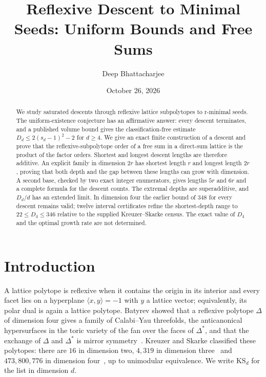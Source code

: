 \documentclass[manuscript]{aomart}
\date{October 26, 2026}
\title[Reflexive descent and free sums]{Reflexive Descent to Minimal Seeds: Uniform Bounds and Free Sums}
\author{Deep Bhattacharjee}
\theoremstyle{definition}
\theoremstyle{remark}
\newcommand{\KS}{\mathrm{KS}}
\newcommand{\ip}[2]{\langle #1,#2\rangle}
\begin{document}
\begin{abstract}
We study saturated descents through reflexive lattice subpolytopes to
r-minimal seeds. The uniform-existence conjecture has an affirmative
answer: every descent terminates, and a published volume bound gives
the classification-free estimate $D_d\le2(s_d-1)^2-2$ for $d\ge4$.
We give an exact finite construction of a descent and prove that the
reflexive-subpolytope order of a free sum in a direct-sum lattice is the
product of the factor orders. Shortest and longest descent lengths are
therefore additive. An explicit family in dimension $2r$ has shortest
length $r$ and longest length $2r$, proving that both depth and the gap
between these lengths can grow with dimension. A second base, checked
by two exact integer enumerators, gives lengths $5r$ and $6r$ and a
complete formula for the descent counts. The extremal depths are
superadditive, and $D_d/d$ has an extended limit. In dimension four the
earlier bound of $348$ for every descent remains valid; twelve interval
certificates refine the shortest-depth range to $22\le D_4\le346$
relative to the supplied Kreuzer--Skarke census. The exact value of
$D_4$ and the optimal growth rate are not determined.
\end{abstract}

\maketitle


\setcounter{tocdepth}{1}
\clearpage
\tableofcontents

\section{Introduction}\label{sec:intro}

A lattice polytope is reflexive when it contains the origin in its
interior and every facet lies on a hyperplane $\ip{x}{y}=-1$ with $y$ a
lattice vector; equivalently, its polar dual is again a lattice polytope.
Batyrev showed that a reflexive polytope $\Delta$ of dimension four gives a
family of Calabi--Yau threefolds, the anticanonical hypersurfaces in the
toric variety of the fan over the faces of $\Delta^*$, and that the
exchange of $\Delta$ and $\Delta^*$ is mirror symmetry~\cite{Bat94}.
Kreuzer and Skarke classified these polytopes: there are $16$ in dimension
two, $4{,}319$ in dimension three~\cite{KS98} and $473{,}800{,}776$ in
dimension four~\cite{KS00}, up to unimodular equivalence. We write $\KS_d$
for the list in dimension $d$.
\end{document}
